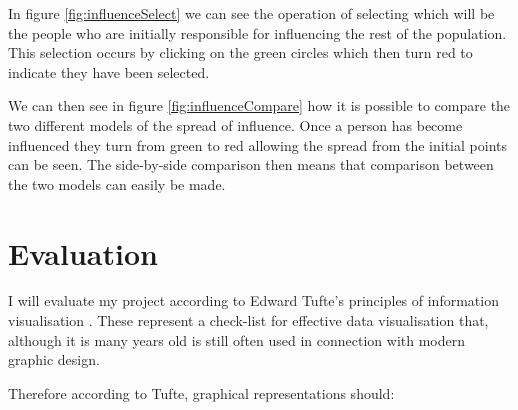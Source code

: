 \documentclass[12pt,a4paper]{article}
\begin{document}
In figure \ref{fig:influenceSelect} we can see the operation of selecting which will be the people who are initially responsible for influencing the rest of the population. This selection occurs by clicking on the green circles which then turn red to indicate they have been selected.

We can then see in figure \ref{fig:influenceCompare} how it is possible to compare the two different models of the spread of influence. Once a person has become influenced they turn from green to red allowing the spread from the initial points can be seen. The side-by-side comparison then means that comparison between the two models can easily be made.

\section{Evaluation}
\noindent
I will evaluate my project according to Edward Tufte's principles of information visualisation \cite{tufte1983visual}. These represent a check-list for effective data visualisation that, although it is many years old is still often used in connection with modern graphic design.

Therefore according to Tufte, graphical representations should:
\end{document}
